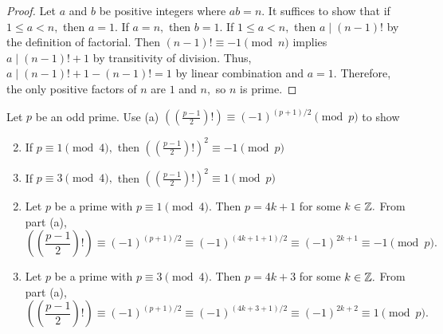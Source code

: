 \documentclass{ximera}
\begin{document}
\begin{proof}
    Let $a$ and $b$ be positive integers where $ab=n.$ It suffices to show that if $1\leq a < n,$ then $a=1.$ If $a=n,$ then $b=1.$ If  $1\leq a < n,$ then $a\mid (n-1)!$ by the definition of factorial. Then $(n-1)!\equiv -1\pmod{n}$ implies $a\mid (n-1)!+1$ by transitivity of division. Thus, $a\mid (n-1)!+1-(n-1)!=1$ by linear combination and $a=1.$ Therefore, the only positive factors of $n$ are $1$ and $n,$ so $n$ is prime.
\end{proof}


\begin{br}
    Let $p$ be an odd prime. Use (a) $\left(\left(\frac{p-1}{2}\right)!\right)\equiv (-1)^{(p+1)/2} \pmod{p}$ to show
    \begin{enumerate}[label=(\alph*)]
        \setcounter{enumi}{1}
        \item If $p\equiv 1\pmod{4},$ then $\left(\left(\frac{p-1}{2}\right)!\right)^2\equiv -1 \pmod{p}$
        
        \item If $p\equiv 3\pmod{4},$ then $\left(\left(\frac{p-1}{2}\right)!\right)^2\equiv 1 \pmod{p}$
    \end{enumerate}

    \begin{solution}

        \begin{enumerate}[label=(\alph*)]
            \setcounter{enumi}{1}
            \item Let $p$ be a prime with $p\equiv 1 \pmod 4.$ Then $p=4k+1$ for some $k\in\mathbb Z.$ From part (a), 
            \[\left(\left(\frac{p-1}{2}\right)!\right)\equiv (-1)^{(p+1)/2} \equiv (-1)^{(4k+1+1)/2}\equiv (-1)^{2k+1}\equiv -1 \pmod{p}.\]

            \item Let $p$ be a prime with $p\equiv 3 \pmod 4.$ Then $p=4k+3$ for some $k\in\mathbb Z.$ From part (a), 
            \[\left(\left(\frac{p-1}{2}\right)!\right)\equiv (-1)^{(p+1)/2} \equiv (-1)^{(4k+3+1)/2}\equiv (-1)^{2k+2}\equiv 1 \pmod{p}.\]
            
        \end{enumerate}
        
    \end{solution}
\end{br}



\end{document}
